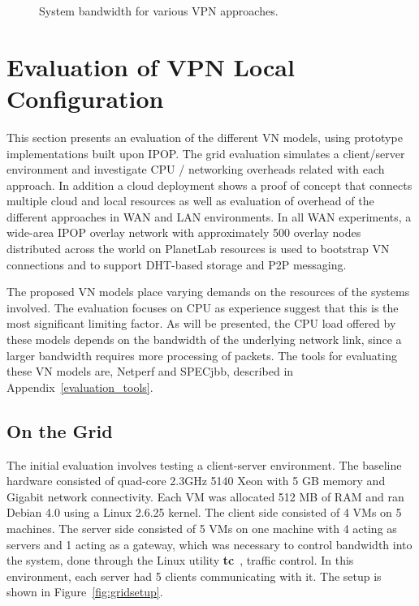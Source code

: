 \begin{figure}
\centering
{}
\caption{System bandwidth for various VPN approaches.}
\label{fig:bandwidth}
\end{figure}

\section{Evaluation of VPN Local Configuration}

This section presents an evaluation of the different VN models, using prototype
implementations built upon IPOP.  The grid evaluation simulates a client/server
environment and investigate CPU / networking overheads related with each
approach.  In addition a cloud deployment shows a proof of concept that
connects multiple cloud and local resources as well as evaluation of overhead
of the different approaches in WAN and LAN environments.  In all WAN
experiments, a wide-area IPOP overlay network with approximately 500 overlay
nodes distributed across the world on PlanetLab resources is used to bootstrap
VN connections and to support DHT-based storage and P2P messaging.

The proposed VN models place varying demands on the resources of the systems
involved. The evaluation focuses on CPU as experience suggest that this is the
most significant limiting factor.  As will be presented, the CPU load offered
by these models depends on the bandwidth of the underlying network link, since
a larger bandwidth requires more processing of packets.  The tools for
evaluating these VN models are, Netperf and SPECjbb, described in
Appendix~\ref{evaluation_tools}.

\subsection{On the Grid}

The initial evaluation involves testing a client-server environment.  The
baseline hardware consisted of quad-core 2.3GHz 5140 Xeon with 5 GB memory and
Gigabit network connectivity.  Each VM was allocated 512 MB of RAM and ran
Debian 4.0 using a Linux 2.6.25 kernel.  The client side consisted of 4 VMs on
5 machines.  The server side consisted of 5 VMs on one machine with 4 acting as
servers and 1 acting as a gateway, which was necessary to control bandwidth
into the system, done through the Linux utility \textbf{tc}~\cite{tc}, traffic
control.  In this environment, each server had 5 clients communicating with it.
The setup is shown in Figure~\ref{fig:gridsetup}.

